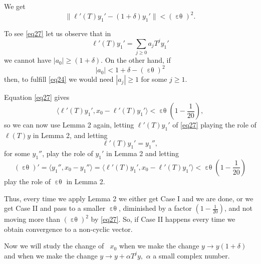 \documentclass[12pt,oneside,reqno]{amsart}
\theoremstyle{definition}
\DeclareMathOperator*{\VV}{[\,\, ]^{-1}}
\DeclareMathOperator*{\VE}{\varepsilon\theta}
\begin{document}
We get 
\begin{equation}\label{eq27}
\|\ell'(T) y_1' - (1+\delta) y_1'	\| < (\VE)^2.
\end{equation}

To see \eqref{eq27} let us observe that in
$$\ell'(T) y_1' = \sum_{j \ge 0} a_j T^j y_1'$$
we cannot have $|a_0| \ge (1+ \delta)$. On the other hand, if 
$$|a_0| < 1 + \delta - (\VE)^2$$
then, to fulfill \eqref{eq24} we would need $|a_j| \ge 1$ for some $j \ge 1$.

Equation \eqref{eq27} gives 
$$\langle \ell'(T) y_1', x_0 - \ell' (T) y_1' \rangle < \VE \left( 1 - \frac{1}{20}\right),$$
so we can now use Lemma 2 again, letting $\ell'(T)y_1'$ of \eqref{eq27} playing the role of $\ell (T) y$ in Lemma 2, and letting
$$\ell'(T) y_1' = y_1'' ,$$ 
for some $y_1''$, play the role of $y_1'$ in Lemma 2 and letting 
$$(\VE)' = \langle y_1'', x_0 - y_1''\rangle = \langle \ell'(T) y_1', x_0 - \ell'(T) y_1'\rangle < \VE \left( 1 - \frac{1}{20}\right)$$
play the role of $\VE$ in Lemma 2.

Thus, every time we apply Lemma 2 we either get Case I and we are done, or we get Case II and pass to a smaller $\VE$, diminished by a factor $(1 - \frac{1}{20})$, and not moving more than $(\VE)^2$ by \eqref{eq27}. So, if Case II happens every time we obtain convergence to a non-cyclic vector.

Now we will study the change of $\VV x_0$ when we make the change $y \rightarrow y (1+\delta)$ and when we make the change  $ y \rightarrow y + \alpha T^j y,$ $\alpha$ a small complex number.
\end{document}
